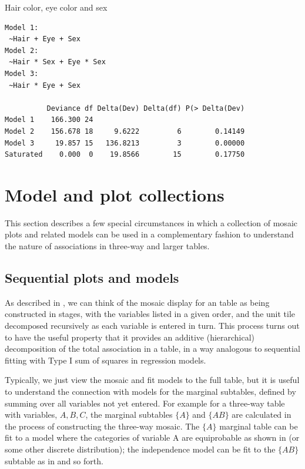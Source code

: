 \documentclass[10pt,krantz2]{krantz}\usepackage[]{graphicx}\usepackage[]{color}
\makeatletter
\newenvironment{kframe}{%
 \def\at@end@of@kframe{}%
 \ifinner\ifhmode%
  \def\at@end@of@kframe{\end{minipage}}%
  \begin{minipage}{\columnwidth}%
 \fi\fi%
 \def\FrameCommand##1{\hskip\@totalleftmargin \hskip-\fboxsep
 \colorbox{shadecolor}{##1}\hskip-\fboxsep
     \hskip-\linewidth \hskip-\@totalleftmargin \hskip\columnwidth}%
 \MakeFramed {\advance\hsize-\width
   \@totalleftmargin\z@ \linewidth\hsize
   \@setminipage}}%
 {\par\unskip\endMakeFramed%
 \at@end@of@kframe}
\newenvironment{knitrout}{}{} %
\renewenvironment{knitrout}{\small\renewcommand{\baselinestretch}{.85}}{} %
\makeatother
\begin{document}
\begin{Example}[HEC2]{Hair color, eye color and sex}
\begin{knitrout}
\begin{kframe}
\begin{verbatim}
Model 1:
 ~Hair + Eye + Sex 
Model 2:
 ~Hair * Sex + Eye * Sex 
Model 3:
 ~Hair * Eye + Sex 

          Deviance df Delta(Dev) Delta(df) P(> Delta(Dev)
Model 1    166.300 24                                    
Model 2    156.678 18     9.6222         6        0.14149
Model 3     19.857 15   136.8213         3        0.00000
Saturated    0.000  0    19.8566        15        0.17750
\end{verbatim}
\end{kframe}
\end{knitrout}

\end{Example}

\section{Model and plot collections}\label{sec:mosaic-collections}

This section describes a few special circumstances in which a 
collection of mosaic plots and related \loglin models
can be used in a complementary fashion to understand the
nature of associations in three-way and larger tables.

\subsection{Sequential plots and models}\label{sec:mosaic-seq}

As described in ,
we can think of the mosaic display for an \nway table as being constructed in stages,
with the variables listed in a given order, and the unit tile decomposed recursively
as each variable is entered in turn.  This process turns out to have the useful property
that it provides an additive (hierarchical) decomposition of the total association in a table,
in a way analogous to sequential fitting with Type I sum of squares in regression models.

Typically, we just view the mosaic and fit models to the full \nway table, but it is
useful to understand the connection with models for the marginal subtables,
defined by summing over all variables not yet entered.
For example for a three-way table with variables,
$A,B,C$, the marginal subtables $\{A\}$ and $\{AB\}$
are calculated
in the process of constructing the three-way mosaic.
The $\{A\}$ marginal table can be fit to a model where the categories
of variable A are equiprobable as shown in 
(or some other discrete distribution);
the independence model can be fit to the $\{AB\}$ subtable as in 
and so forth.
\end{document}
